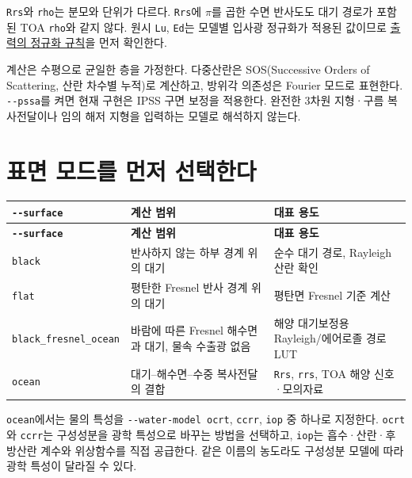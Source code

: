 \texttt{Rrs}와 \texttt{rho}는 분모와 단위가 다르다. \texttt{Rrs}에 \ensuremath{\pi}를 곱한 수면 반사도도 대기 경로가 포함된 TOA \texttt{rho}와 같지 않다. 원시 \texttt{Lu}, \texttt{Ed}는 모델별 입사광 정규화가 적용된 값이므로 \hyperref[chap:05_output_formats]{출력의 정규화 규칙}을 먼저 확인한다.

계산은 수평으로 균일한 층을 가정한다. 다중산란은 SOS(Successive Orders of Scattering, 산란 차수별 누적)로 계산하고, 방위각 의존성은 Fourier 모드로 표현한다. \texttt{-\allowbreak{}-\allowbreak{}pssa}를 켜면 현재 구현은 IPSS 구면 보정을 적용한다. 완전한 3차원 지형·구름 복사전달이나 임의 해저 지형을 입력하는 모델로 해석하지 않는다.

\section{표면 모드를 먼저 선택한다}
\label{sec:auto:01_concepts_geometry:2}

{\TableFont
\begin{longtable}{@{}>{\raggedright\arraybackslash}p{}>{\raggedright\arraybackslash}p{}>{\raggedright\arraybackslash}p{}@{}}
\toprule
\textbf{\texttt{-\allowbreak{}-\allowbreak{}surface}} & \textbf{계산 범위} & \textbf{대표 용도} \\
\midrule
\endfirsthead
\toprule
\textbf{\texttt{-\allowbreak{}-\allowbreak{}surface}} & \textbf{계산 범위} & \textbf{대표 용도} \\
\midrule
\endhead
\bottomrule
\endfoot
\texttt{black} & 반사하지 않는 하부 경계 위의 대기 & 순수 대기 경로, Rayleigh 산란 확인 \\
\texttt{flat} & 평탄한 Fresnel 반사 경계 위의 대기 & 평탄면 Fresnel 기준 계산 \\
\texttt{black\_\allowbreak{}fresnel\_\allowbreak{}ocean} & 바람에 따른 Fresnel 해수면과 대기, 물속 수출광 없음 & 해양 대기보정용 Rayleigh/에어로졸 경로 LUT \\
\texttt{ocean} & 대기--해수면--수중 복사전달의 결합 & \texttt{Rrs}, \texttt{rrs}, TOA 해양 신호·모의자료 \\
\end{longtable}
}

\texttt{ocean}에서는 물의 특성을 \texttt{-\allowbreak{}-\allowbreak{}water-\allowbreak{}model ocrt}, \texttt{ccrr}, \texttt{iop} 중 하나로 지정한다. \texttt{ocrt}와 \texttt{ccrr}는 구성성분을 광학 특성으로 바꾸는 방법을 선택하고, \texttt{iop}는 흡수·산란·후방산란 계수와 위상함수를 직접 공급한다. 같은 이름의 농도라도 구성성분 모델에 따라 광학 특성이 달라질 수 있다.

